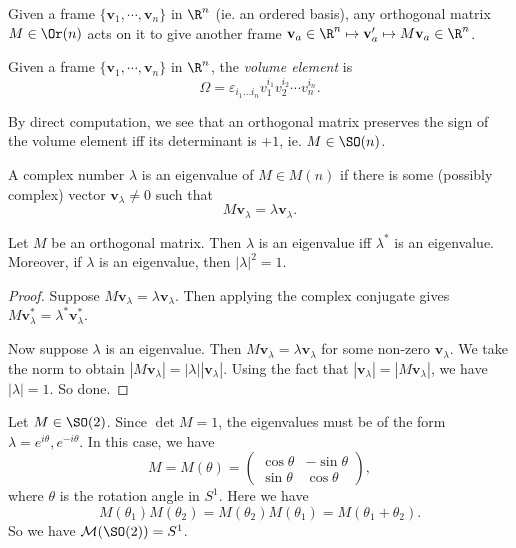 \documentclass[a4paper]{article}
\begin{document}
Given a frame $\{\mathbf{v}_1, \cdots, \mathbf{v}_n\}$ in $\R^n$ (ie. an ordered basis), any orthogonal matrix $M \in \Or(n)$ acts on it to give another frame $\mathbf{v}_a \in \R^n \mapsto \mathbf{v}_a' \mapsto M\mathbf{v}_a \in \R^n$.
\begin{defi}
  Given a frame $\{\mathbf{v}_1, \cdots, \mathbf{v}_n\}$ in $\R^n$, the \emph{volume element} is
  \[
    \Omega = \varepsilon_{i_1 \ldots i_n} v_1^{i_1} v_2^{i_2} \cdots v_n^{i_n}.
  \]
\end{defi}

By direct computation, we see that an orthogonal matrix preserves the sign of the volume element iff its determinant is $+1$, ie. $M \in \SO(n)$.

\begin{defi}[Eigenvalue]
  A complex number $\lambda$ is an eigenvalue of $M \in M(n)$ if there is some (possibly complex) vector $\mathbf{v}_\lambda \not= 0$ such that
  \[
    M \mathbf{v}_\lambda = \lambda \mathbf{v}_\lambda.
  \]
\end{defi}

\begin{thm}
  Let $M$ be an orthogonal matrix. Then $\lambda$ is an eigenvalue iff $\lambda^*$ is an eigenvalue. Moreover, if $\lambda$ is an eigenvalue, then $|\lambda|^2 = 1$.
\end{thm}

\begin{proof}
  Suppose $M \mathbf{v}_\lambda = \lambda \mathbf{v}_\lambda$. Then applying the complex conjugate gives $M \mathbf{v}_\lambda^* = \lambda^* \mathbf{v}_\lambda^*$.

  Now suppose $\lambda$ is an eigenvalue. Then $M\mathbf{v}_\lambda = \lambda \mathbf{v}_\lambda$ for some non-zero $\mathbf{v}_\lambda$. We take the norm to obtain $|M\mathbf{v}_\lambda| = |\lambda| |\mathbf{v}_\lambda|$. Using the fact that $|\mathbf{v}_\lambda| = |M\mathbf{v}_\lambda|$, we have $|\lambda| = 1$. So done.
\end{proof}

\begin{eg}
  Let $M \in \SO(2)$. Since $\det M = 1$, the eigenvalues must be of the form $\lambda = e^{i\theta}, e^{-i\theta}$. In this case, we have
  \[
    M = M(\theta) =
    \begin{pmatrix}
      \cos \theta & -\sin \theta\\
      \sin \theta & \cos \theta
    \end{pmatrix},
  \]
  where $\theta$ is the rotation angle in $S^1$. Here we have
  \[
    M(\theta_1)M(\theta_2) = M(\theta_2) M(\theta_1) = M(\theta_1 + \theta_2).
  \]
  So we have $\mathcal{M}(\SO(2)) = S^1$.
\end{eg}
\end{document}
